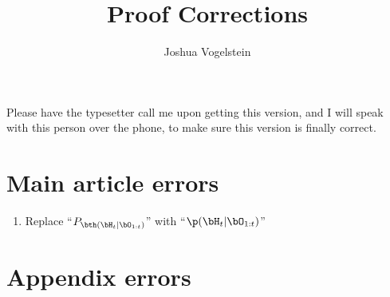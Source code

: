  
\title{Proof Corrections}
\author{Joshua Vogelstein}
\newcommand{\wCab}{[\widehat{\text{Ca}}^{2+}]_b}


\maketitle

Please have the typesetter call me upon getting this version, and I will speak with this person over the phone, to make sure this version is finally correct.  


\section{Main article errors}

\begin{enumerate}
\item Replace ``$P_{\bth (\bH_t | \bO_{1:t})}$'' with ``$\p(\bH_t | \bO_{1:t})$''
\end{enumerate}

\section{Appendix errors}

